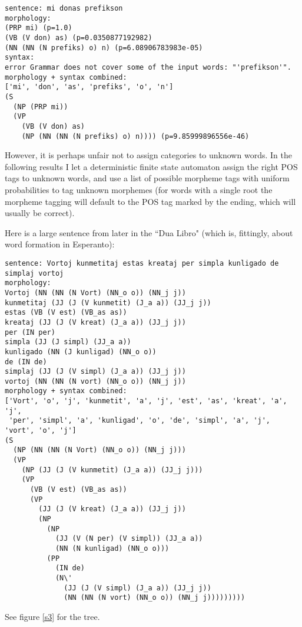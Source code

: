 \documentclass[10pt,a4paper]{article}
\begin{document}
\begin{verbatim}
sentence: mi donas prefikson
morphology:
(PRP mi) (p=1.0)
(VB (V don) as) (p=0.0350877192982)
(NN (NN (N prefiks) o) n) (p=6.08906783983e-05)
syntax:
error Grammar does not cover some of the input words: "'prefikson'".
morphology + syntax combined:
['mi', 'don', 'as', 'prefiks', 'o', 'n']
(S
  (NP (PRP mi))
  (VP
    (VB (V don) as)
    (NP (NN (NN (N prefiks) o) n)))) (p=9.85999896556e-46)
\end{verbatim}

However, it is perhaps unfair not to assign categories to unknown words. 
In the following results I let a deterministic finite state automaton
assign the right POS tags to unknown words, and use a list of possible
morpheme tags with uniform probabilities to tag unknown morphemes (for words
with a single root the morpheme tagging will default to the POS tag marked
by the ending, which will usually be correct).

Here is a large sentence from later in the ``Dua Libro" (which is, fittingly,
about word formation in Esperanto):

\begin{verbatim}
sentence: Vortoj kunmetitaj estas kreataj per simpla kunligado de simplaj vortoj
morphology:
Vortoj (NN (NN (N Vort) (NN_o o)) (NN_j j))
kunmetitaj (JJ (J (V kunmetit) (J_a a)) (JJ_j j))
estas (VB (V est) (VB_as as))
kreataj (JJ (J (V kreat) (J_a a)) (JJ_j j))
per (IN per)
simpla (JJ (J simpl) (JJ_a a))
kunligado (NN (J kunligad) (NN_o o))
de (IN de)
simplaj (JJ (J (V simpl) (J_a a)) (JJ_j j))
vortoj (NN (NN (N vort) (NN_o o)) (NN_j j))
morphology + syntax combined:
['Vort', 'o', 'j', 'kunmetit', 'a', 'j', 'est', 'as', 'kreat', 'a', 'j', 
 'per', 'simpl', 'a', 'kunligad', 'o', 'de', 'simpl', 'a', 'j', 'vort', 'o', 'j']
(S
  (NP (NN (NN (N Vort) (NN_o o)) (NN_j j)))
  (VP
    (NP (JJ (J (V kunmetit) (J_a a)) (JJ_j j)))
    (VP
      (VB (V est) (VB_as as))
      (VP
        (JJ (J (V kreat) (J_a a)) (JJ_j j))
        (NP
          (NP
            (JJ (V (N per) (V simpl)) (JJ_a a))
            (NN (N kunligad) (NN_o o)))
          (PP
            (IN de)
            (N\'
              (JJ (J (V simpl) (J_a a)) (JJ_j j))
              (NN (NN (N vort) (NN_o o)) (NN_j j)))))))))
\end{verbatim}

See figure \ref{s3} for the tree.
\end{document}
